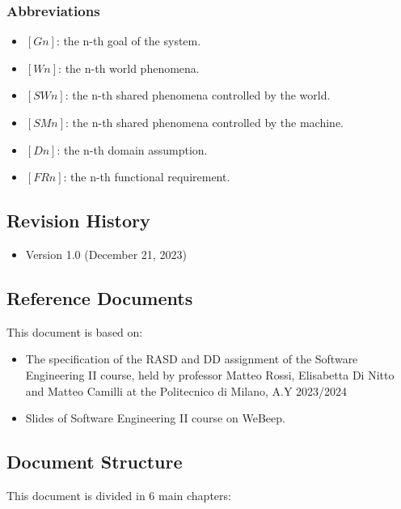\documentclass{article}
\begin{document}
\subsubsection{Abbreviations}
\begin{itemize}
    \item \textbf{$[Gn]$}: the n-th goal of the system.
    \item \textbf{$[Wn]$}: the n-th world phenomena.
    \item \textbf{$[SWn]$}: the n-th shared phenomena controlled by the world.
    \item \textbf{$[SMn]$}: the n-th shared phenomena controlled by the machine.
    \item \textbf{$[Dn]$}: the n-th domain assumption.
    \item \textbf{$[FRn]$}: the n-th functional requirement.
\end{itemize}

\subsection{Revision History}
\begin{itemize}
    \item Version 1.0 (December 21, 2023)
\end{itemize}

\subsection{Reference Documents}
This document is based on:
\begin{itemize}
    \item The specification of the RASD and DD assignment of the Software Engineering II course, held by professor Matteo Rossi, Elisabetta Di Nitto and Matteo Camilli at the Politecnico di Milano, A.Y 2023/2024
    \item Slides of Software Engineering II course on WeBeep.
\end{itemize}

\subsection{Document Structure}
This document is divided in 6 main chapters: \\
\end{document}
